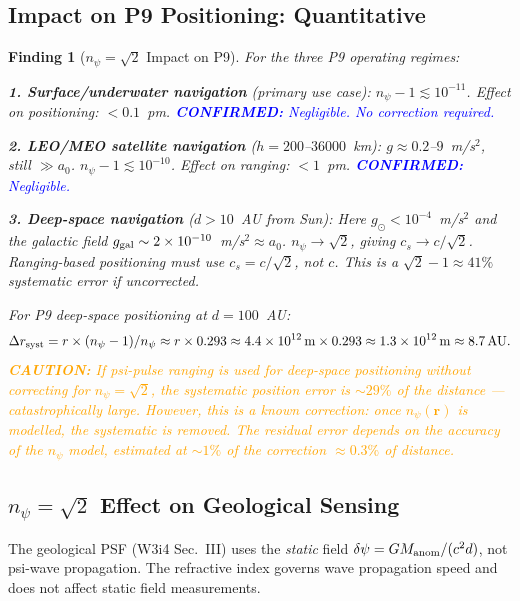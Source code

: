 \documentclass[aps,prd,twocolumn,superscriptaddress,nofootinbib]{revtex4-2}
\newcommand{\confirmed}[1]{\textcolor{blue}{\textbf{CONFIRMED:} #1}}
\newcommand{\caution}[1]{\textcolor{orange}{\textbf{CAUTION:} #1}}
\newtheorem{finding}{Finding}
\begin{document}
\subsection{Impact on P9 Positioning: Quantitative}

\begin{finding}[$n_\psi = \sqrt{2}$ Impact on P9]
\label{find:npsi-p9}
For the three P9 operating regimes:

\textbf{1. Surface/underwater navigation} (primary use case):
$n_\psi - 1 \lesssim 10^{-11}$. Effect on positioning: $< 0.1$~pm.
\confirmed{Negligible. No correction required.}

\textbf{2. LEO/MEO satellite navigation} ($h = 200$--$36000$~km):
$g \approx 0.2$--$9$~m/s$^2$, still $\gg a_0$.
$n_\psi - 1 \lesssim 10^{-10}$. Effect on ranging: $< 1$~pm.
\confirmed{Negligible.}

\textbf{3. Deep-space navigation} ($d > 10$~AU from Sun):
Here $g_\odot < 10^{-4}$~m/s$^2$ and the galactic field
$g_{\rm gal} \sim 2\times10^{-10}$~m/s$^2 \approx a_0$.
$n_\psi \to \sqrt{2}$, giving $c_s \to c/\sqrt{2}$.
Ranging-based positioning must use $c_s = c/\sqrt{2}$, not $c$.
This is a $\sqrt{2} - 1 \approx 41\%$ systematic error if uncorrected.

For P9 deep-space positioning at $d = 100$~AU:
\begin{equation}
\Delta r_{\rm syst} = r \times (n_\psi - 1)/n_\psi
\approx r \times 0.293 \approx 4.4\times10^{12}\,\mathrm{m} \times 0.293
\approx 1.3\times10^{12}\,\mathrm{m} \approx 8.7\,\mathrm{AU}.
\label{eq:deep-space-error}
\end{equation}
\caution{If psi-pulse ranging is used for deep-space positioning without
correcting for $n_\psi = \sqrt{2}$, the systematic position error is
$\sim 29\%$ of the distance --- catastrophically large. However, this is
a \emph{known} correction: once $n_\psi(\mathbf{r})$ is modelled, the
systematic is removed. The residual error depends on the accuracy of
the $n_\psi$ model, estimated at $\sim 1\%$ of the correction
$\approx 0.3\%$ of distance.}
\end{finding}

\subsection{$n_\psi = \sqrt{2}$ Effect on Geological Sensing}

The geological PSF (W3i4 Sec.~III) uses the \emph{static} field
$\delta\psi = G M_{\rm anom}/(c^2 d)$, not psi-wave propagation.
The refractive index governs wave propagation speed and does not
affect static field measurements.
\end{document}

